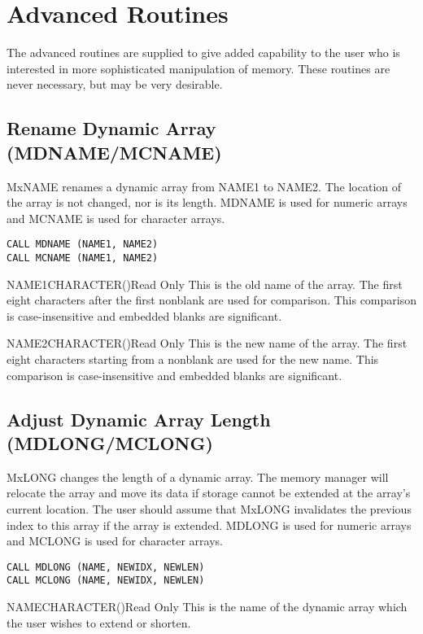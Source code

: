 \section{Advanced Routines}
The advanced routines are supplied to give added capability to the user who
is interested in more sophisticated manipulation of memory.  These routines
are never necessary, but may be very desirable.

\subsection{Rename Dynamic Array (MDNAME/MCNAME)}
MxNAME renames a dynamic array from NAME1 to NAME2.  The location
of the array is not changed, nor is its length. MDNAME is used for numeric
arrays and MCNAME is used for character arrays.
\begin{verbatim}
CALL MDNAME (NAME1, NAME2)
CALL MCNAME (NAME1, NAME2)
\end{verbatim}

\begin{argy}{NAME1}{CHARACTER\last(\last)}{Read Only}
This is the old name of the array.  The first eight characters after the
first nonblank are
used for comparison.
This comparison is case-insensitive and embedded blanks are
significant.
\end{argy}

\begin{argy}{NAME2}{CHARACTER\last(\last)}{Read Only}
This is the new name of the array.  The first eight characters starting
from a nonblank are
used for the new name.
This comparison is case-insensitive and embedded blanks are
significant.
\end{argy}

\subsection{Adjust Dynamic Array Length (MDLONG/MCLONG)}
MxLONG changes the length of a dynamic array.  The memory manager
will relocate the array and move its data if storage cannot be extended at
the array's current location.  The user should assume that MxLONG
invalidates the previous index to this array if the array is extended.
MDLONG is used for numeric arrays and MCLONG is used for character arrays.
\begin{verbatim}
CALL MDLONG (NAME, NEWIDX, NEWLEN)
CALL MCLONG (NAME, NEWIDX, NEWLEN)
\end{verbatim}

\begin{argy}{NAME}{CHARACTER\last(\last)}{Read Only}
This is the name of the dynamic array which the user wishes to extend or
shorten.
\end{argy}


